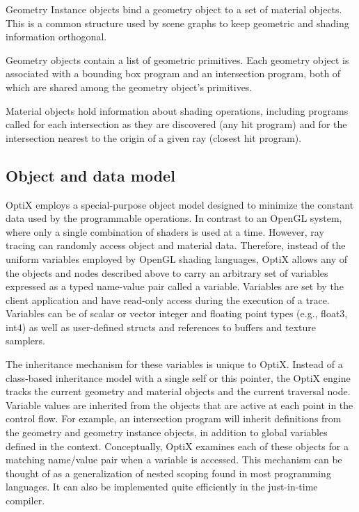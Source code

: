 Geometry Instance objects bind a geometry object to a set of material objects. This is a common structure used by scene graphs to
keep geometric and shading information orthogonal.

Geometry objects contain a list of geometric primitives. Each geometry object is associated with a bounding box program and an
intersection program, both of which are shared among the geometry object’s primitives.

Material objects hold information about shading operations, including programs called for each intersection as they are discovered
(any hit program) and for the intersection nearest to the origin of a
given ray (closest hit program).

\subsection{ Object and data model}

OptiX employs a special-purpose object model designed to minimize the constant data used by the programmable operations. In
contrast to an OpenGL system, where only a single combination
of shaders is used at a time. However, ray tracing can randomly
access object and material data. Therefore, instead of the uniform
variables employed by OpenGL shading languages, OptiX allows
any of the objects and nodes described above to carry an arbitrary
set of variables expressed as a typed name-value pair called a variable. Variables are set by the client application and have read-only
access during the execution of a trace. Variables can be of scalar or
vector integer and floating point types (e.g., float3, int4) as well as
user-defined structs and references to buffers and texture samplers.

The inheritance mechanism for these variables is unique to OptiX.
Instead of a class-based inheritance model with a single self or this
pointer, the OptiX engine tracks the current geometry and material
objects and the current traversal node. Variable values are inherited
from the objects that are active at each point in the control flow. For
example, an intersection program will inherit definitions from the
geometry and geometry instance objects, in addition to global variables defined in the context. Conceptually, OptiX examines each
of these objects for a matching name/value pair when a variable is
accessed. This mechanism can be thought of as a generalization of
nested scoping found in most programming languages. It can also
be implemented quite efficiently in the just-in-time compiler.

